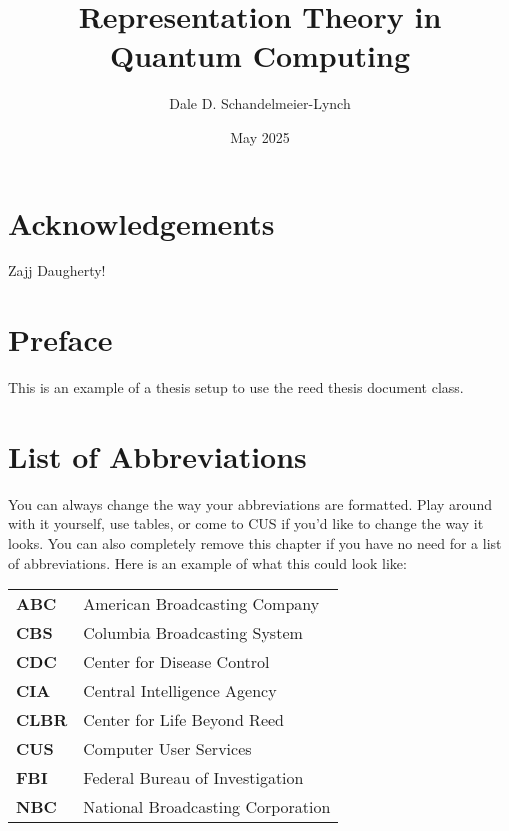 \documentclass[12pt,twoside]{reedthesis}
\title{Representation Theory in Quantum Computing}
\author{Dale D. Schandelmeier-Lynch}
\date{May 2025}
\theoremstyle{plain}   %
\theoremstyle{definition}
\theoremstyle{remark}
\numberwithin{equation}{section}
\begin{document}
  \maketitle
  \frontmatter %
  \pagestyle{empty} %

  \chapter*{Acknowledgements}
  Zajj Daugherty!

  \chapter*{Preface}
  This is an example of a thesis setup to use the reed thesis document class.



  \chapter*{List of Abbreviations}
  You can always change the way your abbreviations are formatted. Play around with it yourself, use tables, or come to CUS if you'd like to change the way it looks. You can also completely remove this chapter if you have no need for a list of abbreviations. Here is an example of what this could look like:

  \begin{table}[h]
    \centering %
    \begin{tabular}{ll}
      \textbf{ABC}  	&  American Broadcasting Company \\
      \textbf{CBS}  	&  Columbia Broadcasting System\\
      \textbf{CDC}  	&  Center for Disease Control \\
      \textbf{CIA}  	&  Central Intelligence Agency\\
      \textbf{CLBR} 	&  Center for Life Beyond Reed\\
      \textbf{CUS}  	&  Computer User Services\\
      \textbf{FBI}  	&  Federal Bureau of Investigation\\
      \textbf{NBC}  	&  National Broadcasting Corporation\\
    \end{tabular}
  \end{table}
\end{document}
